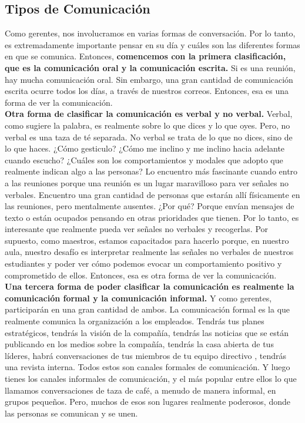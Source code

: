 \documentclass[10pt]{book}
\begin{document}
\subsection{Tipos de Comunicación}
Como gerentes, nos involucramos en varias formas de conversación. Por lo tanto, es extremadamente importante pensar en su día y cuáles son las diferentes formas en que se comunica. Entonces, \textbf{comencemos con la primera clasificación, que es la comunicación oral y la comunicación escrita.} Si es una reunión, hay mucha comunicación oral. Sin embargo, una gran cantidad de comunicación escrita ocurre todos los días, a través de nuestros correos. Entonces, esa es una forma de ver la comunicación.\\
\textbf{Otra forma de clasificar la comunicación es verbal y no verbal.} Verbal, como sugiere la palabra, es realmente sobre lo que dices y lo que oyes. Pero, no verbal es una taza de té separada. No verbal se trata de lo que no dices, sino de lo que haces. ¿Cómo gesticulo? ¿Cómo me inclino y me inclino hacia adelante cuando escucho? ¿Cuáles son los comportamientos y modales que adopto que realmente indican algo a las personas? Lo encuentro más fascinante cuando entro a las reuniones porque una reunión es un lugar maravilloso para ver señales no verbales. Encuentro una gran cantidad de personas que estarán allí físicamente en las reuniones, pero mentalmente ausentes. ¿Por qué? Porque envían mensajes de texto o están ocupados pensando en otras prioridades que tienen. Por lo tanto, es interesante que realmente pueda ver señales no verbales y recogerlas. Por supuesto, como maestros, estamos capacitados para hacerlo porque, en nuestro aula, nuestro desafío es interpretar realmente las señales no verbales de nuestros estudiantes y poder ver cómo podemos evocar un comportamiento positivo y comprometido de ellos. Entonces, esa es otra forma de ver la comunicación.\\
\textbf{Una tercera forma de poder clasificar la comunicación es realmente la comunicación formal y la comunicación informal.} Y como gerentes, participarán en una gran cantidad de ambos. La comunicación formal es la que realmente comunica la organización a los empleados. Tendrás tus planes estratégicos, tendrás la visión de la compañía, tendrás las noticias que se están publicando en los medios sobre la compañía, tendrás la casa abierta de tus líderes, habrá conversaciones de tus miembros de tu equipo directivo , tendrás una revista interna. Todos estos son canales formales de comunicación. Y luego tienes los canales informales de comunicación, y el más popular entre ellos lo que llamamos conversaciones de taza de café, a menudo de manera informal, en grupos pequeños. Pero, muchos de esos son lugares realmente poderosos, donde las personas se comunican y se unen.\\
\end{document}
